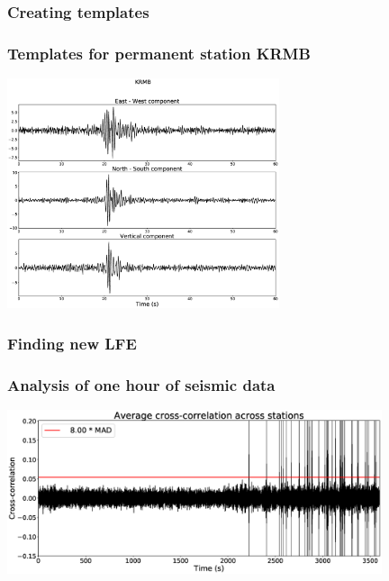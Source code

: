 \documentclass{beamer}
\begin{document}
	\begin{frame}
		\frametitle{Creating templates}
	\end{frame}

	\begin{frame}
		\frametitle{Templates for permanent station KRMB}
		\begin{center}
			\includegraphics[width=8cm, trim={4cm 2cm 4cm 3cm}, clip]{catalog_SC/08042114048_KRMB.eps}
		\end{center}
	\end{frame}

	\begin{frame}
		\frametitle{Finding new LFE}
	\end{frame}

	\begin{frame}
		\frametitle{Analysis of one hour of seismic data}
		\begin{center}
			\includegraphics[width=11cm, trim={0cm 0cm 0cm 0cm}, clip]{catalog_SC/20080421_130000.eps}
		\end{center}
	\end{frame}
\end{document}
